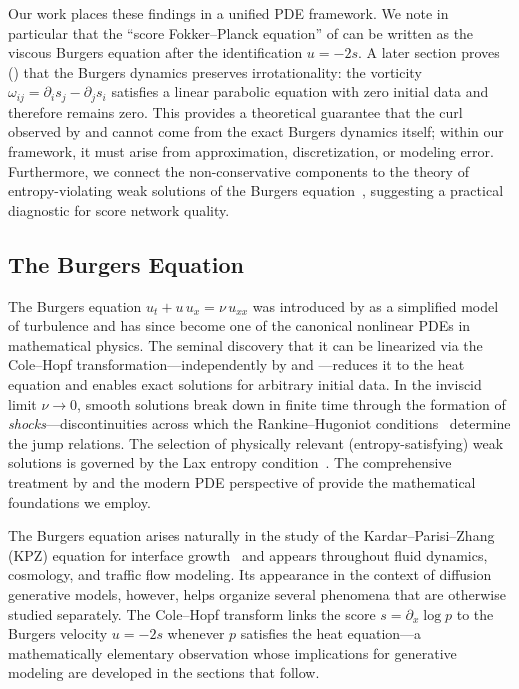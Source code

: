 \documentclass[11pt]{article}
\begin{document}
Our work places these findings in a unified PDE framework.
We note in particular that the ``score Fokker--Planck equation'' of \citet{lai2023fp} can be written as the viscous Burgers equation after the identification $u = -2s$.
A later section proves () that the Burgers dynamics preserves irrotationality: the vorticity $\omega_{ij} = \partial_i s_j - \partial_j s_i$ satisfies a linear parabolic equation with zero initial data and therefore remains zero.
This provides a theoretical guarantee that the curl observed by \citet{vuong2025score} and \citet{lai2023fp} cannot come from the exact Burgers dynamics itself; within our framework, it must arise from approximation, discretization, or modeling error.
Furthermore, we connect the non-conservative components to the theory of entropy-violating weak solutions of the Burgers equation~\citep{lax1957hyperbolic}, suggesting a practical diagnostic for score network quality.

\subsection{The Burgers Equation}

The Burgers equation $u_t + u\,u_x = \nu\,u_{xx}$ was introduced by \citet{burgers1948mathematical} as a simplified model of turbulence and has since become one of the canonical nonlinear PDEs in mathematical physics.
The seminal discovery that it can be linearized via the Cole--Hopf transformation---independently by \citet{hopf1950partial} and \citet{cole1951quasi}---reduces it to the heat equation and enables exact solutions for arbitrary initial data.
In the inviscid limit $\nu \to 0$, smooth solutions break down in finite time through the formation of \emph{shocks}---discontinuities across which the Rankine--Hugoniot conditions~\citep{rankine1870thermodynamic, hugoniot1889propagation} determine the jump relations.
The selection of physically relevant (entropy-satisfying) weak solutions is governed by the Lax entropy condition~\citep{lax1957hyperbolic}.
The comprehensive treatment by \citet{whitham1974linear} and the modern PDE perspective of \citet{evans2010partial} provide the mathematical foundations we employ.

The Burgers equation arises naturally in the study of the Kardar--Parisi--Zhang (KPZ) equation for interface growth~\citep{kardar1986dynamic} and appears throughout fluid dynamics, cosmology, and traffic flow modeling.
Its appearance in the context of diffusion generative models, however, helps organize several phenomena that are otherwise studied separately.
The Cole--Hopf transform links the score $s = \partial_x \log p$ to the Burgers velocity $u = -2s$ whenever $p$ satisfies the heat equation---a mathematically elementary observation whose implications for generative modeling are developed in the sections that follow.
\end{document}
